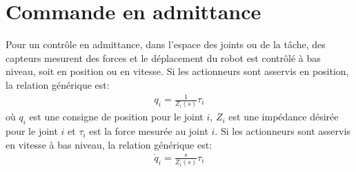 

\section{Commande en admittance}
\label{sec:admcontrol}

Pour un contrôle en admittance, dans l'espace des joints ou de la tâche, des capteurs mesurent des forces et le déplacement du robot est contrôlé à bas niveau, soit en position ou en vitesse. Si les actionneurs sont asservis en position, la relation générique est:
\begin{align}
q_i = \frac{1}{Z_i(s)} \tau_i
\label{eq:admipos}
\end{align}
où $q_i$ est une consigne de position pour le joint $i$, $Z_i$ est une impédance désirée pour le joint $i$ et $\tau_i$ est la force mesurée au joint $i$.
Si les actionneurs sont asservis en vitesse à bas niveau, la relation générique est:
\begin{align}
\dot{q}_i = \frac{s}{Z_i(s)} \tau_i
\label{eq:admispeed}
\end{align}

